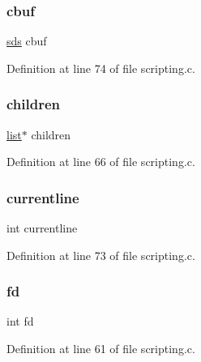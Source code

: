 \subsubsection{\texorpdfstring{cbuf}{cbuf}}
{\footnotesize\ttfamily \hyperlink{sds_8h_ad69abac3df4532879db9642c95f5ef6f}{sds} cbuf}



Definition at line 74 of file scripting.\+c.

\mbox{\label{structldb_state_a6bc412879e51bdab8e86acf420095ef9}} 
\subsubsection{\texorpdfstring{children}{children}}
{\footnotesize\ttfamily \hyperlink{structlist}{list}$\ast$ children}



Definition at line 66 of file scripting.\+c.

\mbox{\label{structldb_state_a1be7dfac6c204d2592700475b5d73fd2}} 
\subsubsection{\texorpdfstring{currentline}{currentline}}
{\footnotesize\ttfamily int currentline}



Definition at line 73 of file scripting.\+c.

\mbox{\label{structldb_state_a6f8059414f0228f0256115e024eeed4b}} 
\subsubsection{\texorpdfstring{fd}{fd}}
{\footnotesize\ttfamily int fd}



Definition at line 61 of file scripting.\+c.

\mbox{\label{structldb_state_a561d6ae2df1882124024d1ad25c05ca0}} 
